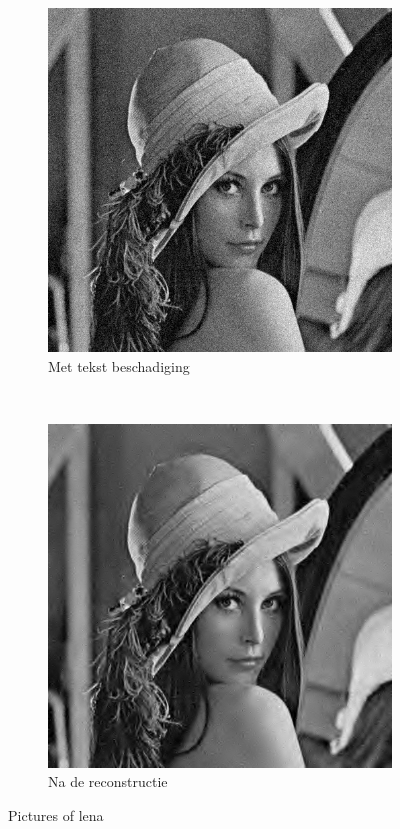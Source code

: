 \begin{figure}
    \centering
    \begin{subfigure}[b]{0.45\textwidth}
        \includegraphics[width=\textwidth]{../src/denoising/image/lenaNoise_bior68.png}
        \caption{Met tekst beschadiging}
        \label{fig:tiger}
    \end{subfigure}
    ~ %
    \begin{subfigure}[b]{0.45\textwidth}
        \includegraphics[width=\textwidth]{../src/denoising/image/lenaDen_bior68.png}
        \caption{Na de reconstructie}
        \label{fig:mouse}
    \end{subfigure}
    \caption{Pictures of lena}\label{fig:optimaleRuisBIOR}
\end{figure}


